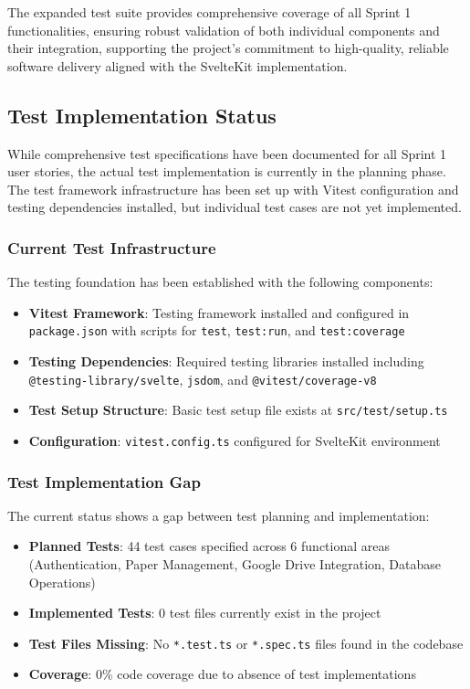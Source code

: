 \documentclass[12pt]{article}
\begin{document}
The expanded test suite provides comprehensive coverage of all Sprint 1 functionalities, ensuring robust validation of both individual components and their integration, supporting the project's commitment to high-quality, reliable software delivery aligned with the SvelteKit implementation.

\subsection{Test Implementation Status}

While comprehensive test specifications have been documented for all Sprint 1 user stories, the actual test implementation is currently in the planning phase. The test framework infrastructure has been set up with Vitest configuration and testing dependencies installed, but individual test cases are not yet implemented.

\subsubsection{Current Test Infrastructure}
The testing foundation has been established with the following components:

\begin{itemize}
  \item \textbf{Vitest Framework}: Testing framework installed and configured in \texttt{package.json} with scripts for \texttt{test}, \texttt{test:run}, and \texttt{test:coverage}
  \item \textbf{Testing Dependencies}: Required testing libraries installed including \texttt{@testing-library/svelte}, \texttt{jsdom}, and \texttt{@vitest/coverage-v8}
  \item \textbf{Test Setup Structure}: Basic test setup file exists at \texttt{src/test/setup.ts}
  \item \textbf{Configuration}: \texttt{vitest.config.ts} configured for SvelteKit environment
\end{itemize}

\subsubsection{Test Implementation Gap}
The current status shows a gap between test planning and implementation:

\begin{itemize}
  \item \textbf{Planned Tests}: 44 test cases specified across 6 functional areas (Authentication, Paper Management, Google Drive Integration, Database Operations)
  \item \textbf{Implemented Tests}: 0 test files currently exist in the project
  \item \textbf{Test Files Missing}: No \texttt{*.test.ts} or \texttt{*.spec.ts} files found in the codebase
  \item \textbf{Coverage}: 0\% code coverage due to absence of test implementations
\end{itemize}
\end{document}
